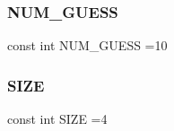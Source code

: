 \subsubsection{NUM\_GUESS}
{\footnotesize\ttfamily const int N\+U\+M\+\_\+\+G\+U\+E\+SS =10}

\mbox{\label{main_8cpp_af08413a3ee12cf78b0ddeea71e2648b3}} 
\subsubsection{SIZE}
{\footnotesize\ttfamily const int S\+I\+ZE =4}

